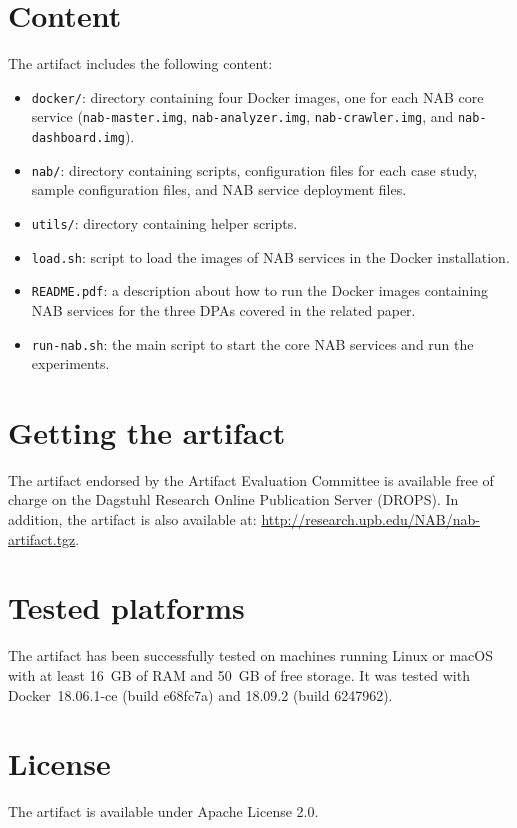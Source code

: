 \documentclass[a4paper,english]{darts-v2019}
\newenvironment{content}{\section{Content}}{}
\newenvironment{getting}{\section{Getting the artifact} The artifact
endorsed by the Artifact Evaluation Committee is available free of
charge on the Dagstuhl Research Online Publication Server (DROPS).}{}
\newenvironment{platforms}{\section{Tested platforms}}{}
\newcommand{\license}[1]{{\section{License}#1}}
\begin{document}
\begin{content}
The artifact includes the following content:
\begin{itemize}
\item {\tt docker/}: directory containing four Docker images, one for each NAB core service ({\tt nab-master.img}, {\tt nab-analyzer.img}, {\tt nab-crawler.img}, and {\tt nab-dashboard.img}).
\item {\tt nab/}: directory containing scripts, configuration files for each case study, sample configuration files, and NAB service deployment files.
\item {\tt utils/}: directory containing helper scripts.
\item {\tt load.sh}: script to load the images of NAB services in the Docker installation.
\item {\tt README.pdf}: a description about how to run the Docker images containing NAB services for the three DPAs covered in the related paper.
\item {\tt run-nab.sh}: the main script to start the core NAB services and run the experiments.


\end{itemize}
\end{content}

\begin{getting}
In addition, the artifact is also available at:
\url{http://research.upb.edu/NAB/nab-artifact.tgz}.
\end{getting}

\begin{platforms}
The artifact has been successfully tested on machines running Linux or macOS with at least 16~GB of RAM and 50~GB of free storage. It was tested with Docker~18.06.1-ce (build e68fc7a) and 18.09.2 (build 6247962).
\end{platforms}

\license{The artifact is available under Apache License 2.0.}
\end{document}
